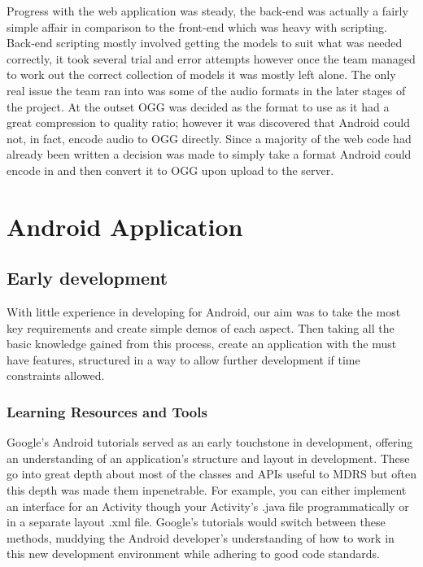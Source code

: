 \documentclass{l3proj}
\begin{document}
Progress with the web application was steady, the back-end was actually a fairly simple affair in comparison to the front-end which was heavy with scripting. 
Back-end scripting mostly involved getting the models to suit what was needed correctly, it took several trial and error attempts however once the team managed to work out the correct collection of models it was mostly left alone. The only real issue the team ran into was some of the audio formats in the later stages of the project. At the outset OGG was decided as the format to use as it had a great compression to quality ratio; however it was discovered that Android could not, in fact, encode audio to OGG directly. Since a majority of the web code had already been written a decision was made to simply take a format Android could encode in and then convert it to OGG upon upload to the server. 


\section{Android Application}

\subsection{Early development} With little experience in developing for Android,
our aim was to take the most key requirements and create simple demos of each
aspect. Then taking all the basic knowledge gained from this process, create an
application with the must have features, structured in a way to allow further development if time constraints allowed.

\subsubsection{Learning Resources and Tools} Google's Android tutorials served
as an early touchstone in development, offering an understanding of an
application's structure and layout in development. These go into great depth
about most of the classes and APIs useful to MDRS but often this depth was made
them inpenetrable. For example, you can either implement an interface for an
Activity though your Activity's .java file programmatically or in a separate
layout .xml file. Google's tutorials would switch between these methods,
muddying the Android developer's understanding of how to work in this new
development environment while adhering to good code standards.
\end{document}
